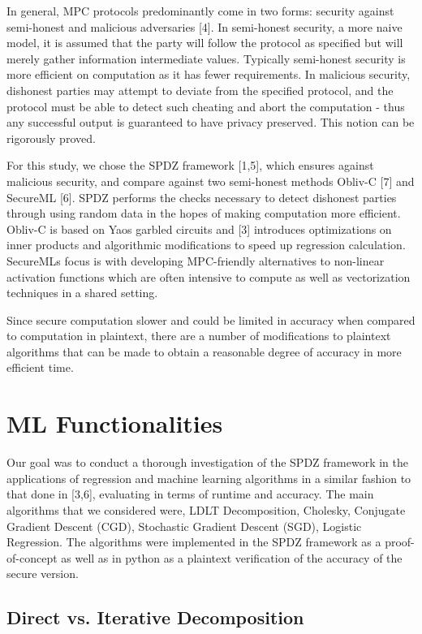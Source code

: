 \documentclass{article}
\begin{document}
In general, MPC protocols predominantly come in two forms: security against semi-honest and malicious adversaries [4]. In semi-honest security, a more naive model, it is assumed that the party will follow the protocol as specified but will merely gather information intermediate values. Typically semi-honest security is more efficient on computation as it has fewer requirements. In malicious security, dishonest parties may attempt to deviate from the specified protocol, and the protocol must be able to detect such cheating and abort the computation - thus any successful output is guaranteed to have privacy preserved. This notion can be rigorously proved. 

For this study, we chose the SPDZ framework [1,5], which ensures against malicious security, and compare against two semi-honest methods Obliv-C [7] and SecureML [6]. SPDZ performs the checks necessary to detect dishonest parties through using random data in the hopes of making computation more efficient. Obliv-C is based on Yao\textquotesingle s garbled circuits and [3] introduces optimizations on inner products and algorithmic modifications to speed up regression calculation. SecureML\textquotesingle s focus is with developing MPC-friendly alternatives to non-linear activation functions which are often intensive to compute as well as vectorization techniques in a shared setting. 

Since secure computation slower and could be limited in accuracy when compared to computation in plaintext, there are a number of modifications to plaintext algorithms that can be made to obtain a reasonable degree of accuracy in more efficient time.

\section{ML Functionalities}

Our goal was to conduct a thorough investigation of the SPDZ framework in the applications of regression and machine learning algorithms in a similar fashion to that done in  [3,6], evaluating in terms of runtime and accuracy. The main algorithms that we considered were, LDLT Decomposition, Cholesky, Conjugate Gradient Descent (CGD), Stochastic Gradient Descent (SGD), Logistic Regression. The algorithms were implemented in the SPDZ framework as a proof-of-concept as well as in python as a plaintext verification of the accuracy of the secure version.

\subsection{Direct vs. Iterative Decomposition}
\end{document}
